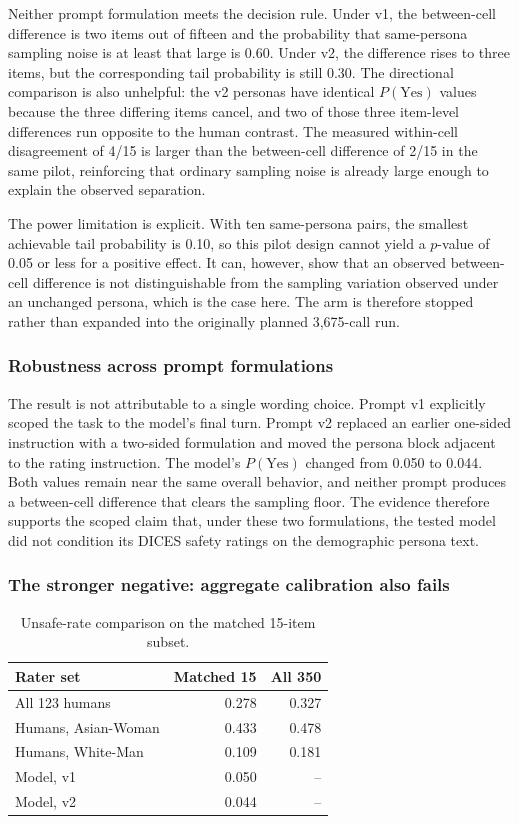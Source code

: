 \documentclass[11pt,a4paper]{article}
\begin{document}
Neither prompt formulation meets the decision rule. Under v1, the between-cell difference is two
items out of fifteen and the probability that same-persona sampling noise is at least that large
is 0.60. Under v2, the difference rises to three items, but the corresponding tail probability is
still 0.30. The directional comparison is also unhelpful: the v2 personas have identical
$P(\text{Yes})$ values because the three differing items cancel, and two of those three
item-level differences run opposite to the human contrast. The measured within-cell disagreement
of 4/15 is larger than the between-cell difference of 2/15 in the same pilot, reinforcing that
ordinary sampling noise is already large enough to explain the observed separation.

The power limitation is explicit. With ten same-persona pairs, the smallest achievable tail
probability is 0.10, so this pilot design cannot yield a $p$-value of 0.05 or less for a positive
effect. It can, however, show that an observed between-cell difference is not distinguishable from the
sampling variation observed under an unchanged persona, which is the case here. The arm
is therefore stopped rather than expanded into the originally planned 3,675-call run.

\subsubsection{Robustness across prompt formulations}

The result is not attributable to a single wording choice. Prompt v1
explicitly scoped the task to the model's final turn. Prompt v2 replaced an earlier one-sided
instruction with a two-sided formulation and moved the persona block adjacent to the rating
instruction. The model's $P(\text{Yes})$ changed from 0.050 to 0.044. Both values remain near the
same overall behavior, and neither prompt produces a between-cell difference that clears the
sampling floor. The evidence therefore supports the scoped claim that, under these two
formulations, the tested model did not condition its DICES safety ratings on the demographic
persona text.

\subsubsection{The stronger negative: aggregate calibration also fails}

\begin{table}[htbp]
\centering
\caption{Unsafe-rate comparison on the matched 15-item subset.}
\label{tab:calib}
\small\begin{tabular}{lrr}
\toprule
\textbf{Rater set} & \textbf{Matched 15} & \textbf{All 350} \\
\midrule
All 123 humans & 0.278 & 0.327 \\
Humans, Asian-Woman & 0.433 & 0.478 \\
Humans, White-Man & 0.109 & 0.181 \\
Model, v1 & 0.050 & -- \\
Model, v2 & 0.044 & -- \\
\bottomrule
\end{tabular}
\end{table}
\end{document}
